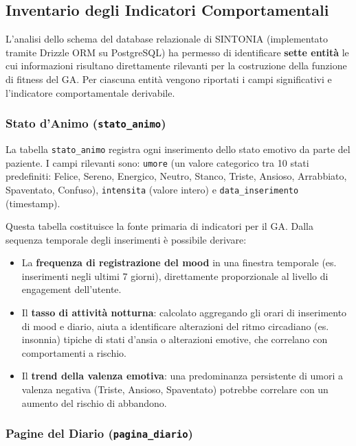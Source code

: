 \subsection{Inventario degli Indicatori Comportamentali}
\label{subsec:inventario_indicatori}

L'analisi dello schema del database relazionale di SINTONIA (implementato tramite Drizzle ORM su PostgreSQL) ha permesso di identificare \textbf{sette entità} le cui informazioni risultano direttamente rilevanti per la costruzione della funzione di fitness del GA. Per ciascuna entità vengono riportati i campi significativi e l'indicatore comportamentale derivabile.

\subsubsection{Stato d'Animo (\texttt{stato\_animo})}

La tabella \texttt{stato\_animo} registra ogni inserimento dello stato emotivo da parte del paziente. I campi rilevanti sono: \texttt{umore} (un valore categorico tra 10 stati predefiniti: Felice, Sereno, Energico, Neutro, Stanco, Triste, Ansioso, Arrabbiato, Spaventato, Confuso), \texttt{intensita} (valore intero) e \texttt{data\_inserimento} (timestamp).

Questa tabella costituisce la fonte primaria di indicatori per il GA. Dalla sequenza temporale degli inserimenti è possibile derivare:
\begin{itemize}
    \item La \textbf{frequenza di registrazione del mood} in una finestra temporale (es. inserimenti negli ultimi 7 giorni), direttamente proporzionale al livello di engagement dell'utente.
    \item Il \textbf{tasso di attività notturna}: calcolato aggregando gli orari di inserimento di mood e diario, aiuta a identificare alterazioni del ritmo circadiano (es. insonnia) tipiche di stati d'ansia o alterazioni emotive, che correlano con comportamenti a rischio.
    \item Il \textbf{trend della valenza emotiva}: una predominanza persistente di umori a valenza negativa (Triste, Ansioso, Spaventato) potrebbe correlare con un aumento del rischio di abbandono.
\end{itemize}

\subsubsection{Pagine del Diario (\texttt{pagina\_diario})}


